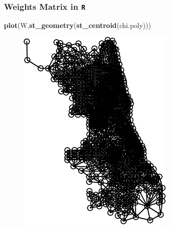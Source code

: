 \documentclass[
  shownotes,
  xcolor={svgnames},
  hyperref={colorlinks,citecolor=DarkBlue,linkcolor=DarkRed,urlcolor=DarkBlue}
   , aspectratio=169]{beamer}
\newenvironment{Shaded}{\begin{snugshade}}{\end{snugshade}}
\newcommand{\KeywordTok}[1]{\textcolor[rgb]{0.13,0.29,0.53}{\textbf{#1}}}
\newcommand{\NormalTok}[1]{#1}
\begin{document}
\begin{frame}[fragile]
\frametitle{Weights Matrix in \texttt{R}}


\begin{scriptsize}
\begin{Shaded}
\begin{Highlighting}[]
\KeywordTok{plot}\NormalTok{(W,}\KeywordTok{st\_geometry}\NormalTok{(}\KeywordTok{st\_centroid}\NormalTok{(chi.poly)))}
\end{Highlighting}
\end{Shaded}
\end{scriptsize}


 \begin{figure}[H] \centering
    \captionsetup{justification=centering}
    \includegraphics[scale=0.7]{figures/neighbors_plot-1.pdf}
   \end{figure}


\end{frame}
\end{document}
